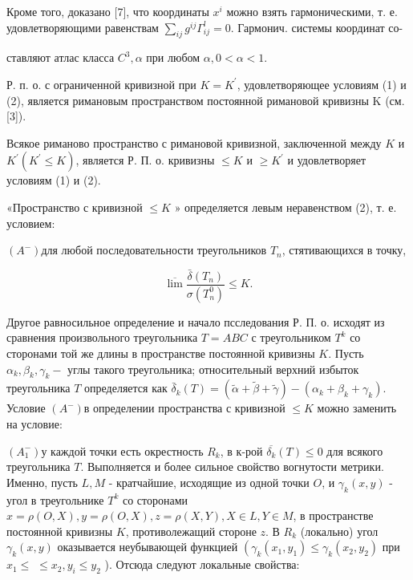 \documentclass[10pt]{article}
\begin{document}
Кроме того, доказано [7], что координаты $x^{i}$ можно взять гармоническими, т. е. удовлетворяющими равенствам $\sum_{i j} g^{i j} \Gamma_{i j}^{l}=0$. Гармонич. системы координат со-



ставляют атлас класса $C^{3}, \alpha$ при любом $\alpha, 0<\alpha<1$.

Р. п. о. с ограниченной кривизной при $K=K^{\prime}$, удовлетворяющее условиям (1) и (2), является римановым пространством постоянной римановой кривизны K (см. [3]).



Всякое риманово пространство с римановой кривизной, заключенной между $K$ и $K^{\prime}\left(K^{\prime} \leqslant K\right)$, является Р. П. о. кривизны $\leqslant K$ и $\geqslant K^{\prime}$ и удовлетворяет условиям (1) и (2).



«Пространство с кривизной $\leqslant K$ » определяется левым неравенством (2), т. е. условием:



$\left(A^{-}\right)$для любой последовательности треугольников $T_{n}$, стятивающихся в точку,



\[

\overline{\lim } \frac{\bar{\delta}\left(T_{n}\right)}{\sigma\left(T_{n}^{0}\right)} \leqslant K .

\]



Другое равносильное определение и начало псследования Р. П. о. исходят из сравнения произвольного треугольника $T=A B C$ с треугольником $T^{k}$ со сторонами той же длины в пространстве постоянной кривизны $K$. Пусть $\alpha_{k}, \beta_{k}, \gamma_{k}-$ углы такого треугольника; относительный верхний избыток треугольника $T$ определяется как $\bar{\delta}_{k}(T)=(\tilde{\alpha}+\tilde{\beta}+\tilde{\gamma})-\left(\alpha_{k}+\beta_{k}+\gamma_{k}\right)$. Условие $\left(A^{-}\right)$в определении пространства с кривизной $\leqslant K$ можно заменить на условие:



$\left(A_{1}^{-}\right)$у каждой точки есть окрестность $R_{k}$, в к-рой $\overline{\delta_{k}}(T) \leqslant 0$ для всякого треугольника $T$. Выполняется и более сильное свойство вогнутости метрики. Именно, пусть $L, M$ - кратчайшие, исходящие из одной точки $O$, и $\gamma_{k}(x, y)$ - угол в треугольнике $T^{k}$ со сторонами $x=\rho(O, X), y=\rho(O, X), z=\rho(X, Y), X \in L, Y \in M$, в пространстве постоянной кривизны $K$, противолежащий стороне $z$. В $R_{k}$ (локально) угол $\gamma_{k}(x, y)$ оказывается неубывающей функцией $\left(\gamma_{k}\left(x_{1}, y_{1}\right) \leqslant \gamma_{k}\left(x_{2}, y_{2}\right)\right.$ при $x_{1} \leqslant$ $\leqslant x_{2}, y_{i} \leqslant y_{2}$ ). Отсюда следуют локальные свойства:
\end{document}
